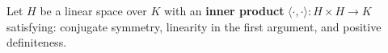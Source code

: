 Let $H$ be a linear space over $K$ with an \textbf{inner product} $\langle \cdot, \cdot \rangle : H \times H \to K$ satisfying: conjugate symmetry, linearity in the first argument, and positive definiteness.
